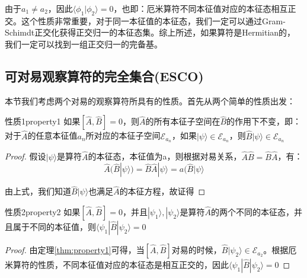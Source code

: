         由于$a_1\ne a_2$，因此$\langle\phi_1|\phi_2\rangle=0$，也即：厄米算符不同本征值对应的本征态相互正交。这个性质非常重要，对于同一本征值的本征态，我们一定可以通过Gram-Schimdt正交化获得正交归一的本征态集。综上所述，如果算符是Hermitian的，我们一定可以找到一组正交归一的完备基。
    \subsection{可对易观察算符的完全集合(ESCO)}\label{subsection:ESCO}
    本节我们考虑两个对易的观察算符所具有的性质。首先从两个简单的性质出发：
    \begin{theorem}{性质1}{property1}
    如果$[\hat{A},\hat{B}]=0$，则$\hat{A}$的所有本征子空间在$\hat{B}$的作用下不变，即：对于$\hat{A}$的任意本征值$a_n$所对应的本征子空间$\mathscr{E}_{a_n}$，如果$|\psi\rangle\in\mathscr{E}_{a_n}$，则$\hat{B}|\psi\rangle\in\mathscr{E}_{a_n}$
    \end{theorem}
    \begin{proof}
    假设$|\psi\rangle$是算符$\hat{A}$的本征态，本征值为a，则根据对易关系，$\hat{A}\hat{B}=\hat{B}\hat{A}$，有：
    \begin{equation}
        \hat{A}(\hat{B}|\psi\rangle)=\hat{B}\hat{A}|\psi\rangle=a(\hat{B}|\psi\rangle
    \end{equation}
    
    由上式，我们知道$\hat{B}|\psi\rangle$也满足$\hat{A}$的本征方程，故证得
    \end{proof}
    \begin{theorem}{性质2}{property2}
        如果$[\hat{A},\hat{B}]=0$，并且$|\psi_1\rangle,|\psi_2\rangle$是算符$\hat{A}$的两个不同的本征态，并且属于不同的本征值，则$\langle\psi_1|\hat{B}|\psi_2\rangle=0$
    \end{theorem}
    \begin{proof}
    由定理\ref{thm:property1}可得，当$[\hat{A},\hat{B}]$对易的时候，$\hat{B}|\psi_2\rangle\in \mathscr{E}_{a_2}$。根据厄米算符的性质，不同本征值对应的本征态是相互正交的，因此$\langle\psi_1|\hat{B}|\psi_2\rangle=0$
    \end{proof}
    
